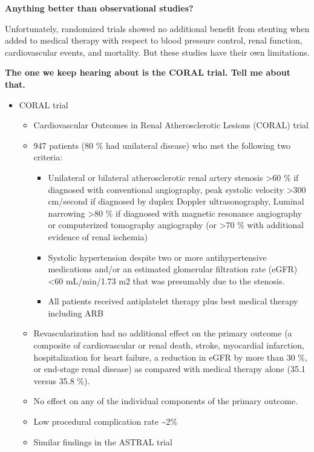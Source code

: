 \documentclass[
]{book}
\begin{document}
\textbf{Anything better than observational studies?}

Unfortunately, randomized trials showed no additional benefit from
stenting when added to medical therapy with respect to blood pressure
control, renal function, cardiovascular events, and mortality. But these
studies have their own limitations.

\textbf{The one we keep hearing about is the CORAL trial. Tell me about
that.}

\begin{itemize}
\item
  CORAL trial \citep{cooperStentingMedicalTherapy2014}

  \begin{itemize}
  \item
    Cardiovascular Outcomes in Renal Atherosclerotic Lesions (CORAL)
    trial
  \item
    947 patients (80 \% had unilateral disease) who met the following
    two criteria:

    \begin{itemize}
    \item
      Unilateral or bilateral atherosclerotic renal artery
      stenosis \textgreater60 \% if diagnosed with conventional angiography,
      peak systolic velocity \textgreater300 cm/second if diagnosed by duplex
      Doppler ultrasonography, Luminal narrowing \textgreater80 \% if
      diagnosed with magnetic resonance angiography or
      computerized tomography angiography (or \textgreater70 \% with
      additional evidence of renal ischemia)
    \item
      Systolic hypertension despite two or more antihypertensive
      medications and/or an estimated glomerular filtration rate
      (eGFR) \textless60 mL/min/1.73 m2 that was presumably due to the
      stenosis.
    \item
      All patients received antiplatelet therapy plus best medical
      therapy including ARB
    \end{itemize}
  \item
    Revascularization had no additional effect on the primary
    outcome (a composite of cardiovascular or renal death, stroke,
    myocardial infarction, hospitalization for heart failure, a
    reduction in eGFR by more than 30 \%, or end-stage renal disease)
    as compared with medical therapy alone (35.1 versus 35.8 \%).
  \item
    No effect on any of the individual components of the primary
    outcome.
  \item
    Low procedural complication rate \textasciitilde2\%
  \item
    Similar findings in the ASTRAL trial
    \citep{astralinvestigatorsRevascularizationMedicalTherapy2009}
  \end{itemize}
\end{itemize}
\end{document}
